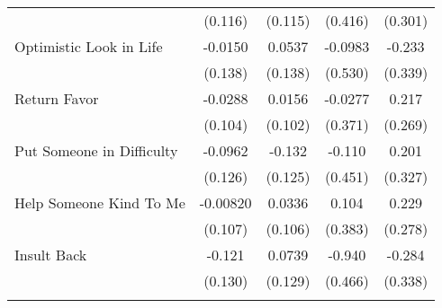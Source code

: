 {\begin{tabular}{l*{4}{c}}
            &     (0.116)         &     (0.115)         &     (0.416)         &     (0.301)         \\
[1em]
Optimistic Look in Life&     -0.0150         &      0.0537         &     -0.0983         &      -0.233         \\
            &     (0.138)         &     (0.138)         &     (0.530)         &     (0.339)         \\
[1em]
Return Favor&     -0.0288         &      0.0156         &     -0.0277         &       0.217         \\
            &     (0.104)         &     (0.102)         &     (0.371)         &     (0.269)         \\
[1em]
Put Someone in Difficulty&     -0.0962         &      -0.132         &      -0.110         &       0.201         \\
            &     (0.126)         &     (0.125)         &     (0.451)         &     (0.327)         \\
[1em]
Help Someone Kind To Me&    -0.00820         &      0.0336         &       0.104         &       0.229         \\
            &     (0.107)         &     (0.106)         &     (0.383)         &     (0.278)         \\
[1em]
Insult Back &      -0.121         &      0.0739         &      -0.940\sym{*}  &      -0.284         \\
            &     (0.130)         &     (0.129)         &     (0.466)         &     (0.338)         \\
\hline\hline
{}\\
\end{tabular}
}
